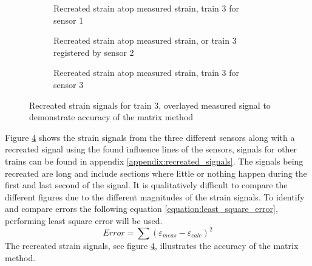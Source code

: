 \begin{figure}[H]
	\centering
	\begin{subfigure}[t]{0.9\textwidth}
		
		\caption{Recreated strain atop measured strain, train 3 for sensor 1}
		\label{recreated_sensor_middle_train3}
	\end{subfigure}
	\centering
	\begin{subfigure}[t]{0.9\textwidth}
		
		\caption{Recreated strain atop measured strain, or train 3 registered by sensor 2 }
		\label{recreated_sensor_trond_train3}
	\end{subfigure}
	\centering
	\begin{subfigure}[t]{0.9\textwidth}
		
		\caption{Recreated strain atop measured strain, train 3 for sensor 3}
		\label{recreated_sensor_heimdal_train3}
	\end{subfigure}
	\caption{Recreated strain signals for train 3, overlayed measured signal to demonstrate accuracy of the matrix method}
	\label{fig:recreated_strains}
\end{figure}
Figure \ref{fig:recreated_strains} shows the strain signals from the three different sensors along with a recreated signal using the found influence lines of the sensors, signals for other trains can be found in appendix \ref{appendix:recreated_signals}. The signals being recreated are long and include sections where little or nothing happen during the first and last second of the signal. It is qualitatively difficult to compare the different figures due to the different magnitudes of the strain signals.
To identify and compare errors the following equation \ref{equation:least_square_error}, performing least square error will be used.
\begin{equation}
	Error = \sum{ (\varepsilon_{meas} - \varepsilon_{calc})^2}
	\label{equation:least_square_error}
\end{equation}
The recreated strain signals, see figure \ref{fig:recreated_strains}, illustrates the accuracy of the matrix method.
